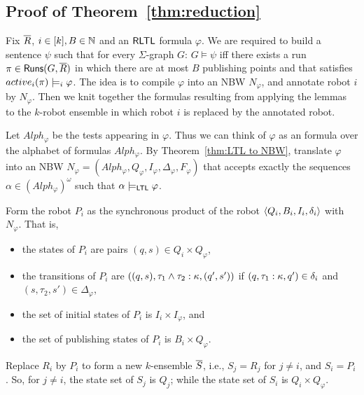 \fi

\subsection{Proof of Theorem~\ref{thm:reduction}} \label{sec:proof of PVPdec}
Fix $\overline{R}$, $i \in [k], B \in \mathbb{N}$ and an $\textsf{RLTL}$ formula $\varphi$. We are required to build a sentence $\psi$ such that for every $\Sigma$-graph $G$: 
  $G \models \psi$ iff there exists a run $\pi \in \mathsf{Runs}(G,\overline{R})$ in which there are at most $B$ publishing points and that satisfies $active_i(\pi) \models_i \varphi$. The idea is to compile $\varphi$ into an NBW $N_\varphi$, and annotate robot $i$ by $N_\varphi$. 
  Then we knit together the formulas resulting from applying the 
  lemmas to the $k$-robot ensemble in which robot $i$ is replaced by the annotated robot.
  
  
  Let $Alph_\varphi$ be the tests appearing in $\varphi$. Thus we can think of $\varphi$ as an \LTL formula over the alphabet of \msol formulas $Alph_\varphi$.
  By Theorem~\ref{thm:LTL to NBW}, translate $\varphi$ into an NBW $N_\varphi = (Alph_\varphi,Q_\varphi, I_\varphi, \Delta_\varphi, F_\varphi)$ 
  that accepts exactly the sequences $\alpha \in (Alph_\varphi)^\omega$ such that $\alpha \models_\mathsf{LTL} \varphi$.

  Form the robot $P_i$ as the synchronous product of the robot $\langle {Q_i,B_i,I_i,\delta_i} \rangle$ with $N_\varphi$. That is, 
  \begin{itemize}
  \item the states of $P_i$ are pairs $(q,s) \in Q_i \times Q_\varphi$, 
  \item the transitions of $P_i$ are   $((q,s), \tau_1 \wedge \tau_2:\kappa,(q',s'))$ if $(q,\tau_1:\kappa,q') \in \delta_i$ and $(s,\tau_2,s') \in \Delta_\varphi$, 
  \item the set of initial states of $P_i$ is $I_i \times I_\varphi$, and 
  \item the set of publishing states of $P_i$ is $B_i \times Q_\varphi$.
  \end{itemize}
  Replace $R_i$ by $P_i$ to form a new $k$-ensemble $\overline{S}$, i.e., $S_j = R_j$ for $j \neq i$, and $S_i = P_i$. So, for $j \neq i$, the state set of $S_j$ is $Q_j$; while the state set of $S_i$ is $Q_i \times Q_\varphi$.
  
